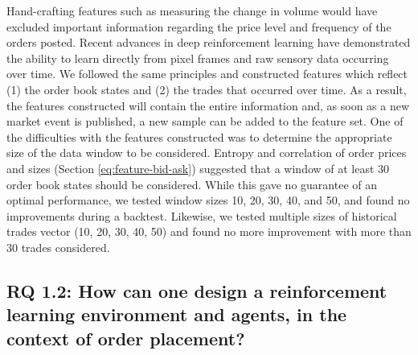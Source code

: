 Hand-crafting features such as measuring the change in volume would have excluded important information regarding the price level and frequency of the orders posted.
Recent advances in deep reinforcement learning have demonstrated the ability to learn directly from pixel frames\cite{mnih2013playing} and raw sensory data\cite{mnih2015human} occurring over time.
We followed the same principles and constructed features which reflect (1) the order book states and (2) the trades that occurred over time.
As a result, the features constructed will contain the entire information and, as soon as a new market event is published, a new sample can be added to the feature set.
One of the difficulties with the features constructed was to determine the appropriate size of the data window to be considered.
Entropy and correlation of order prices and sizes (Section \ref{eq:feature-bid-ask}) suggested that a window of at least 30 order book states should be considered.
While this gave no guarantee of an optimal performance, we tested window sizes 10, 20, 30, 40, and 50, and found no improvements during a backtest.
Likewise, we tested multiple sizes of historical trades vector (10, 20, 30, 40, 50) and found no more improvement with more than 30 trades considered.

\subsection{RQ 1.2: How can one design a reinforcement learning environment and agents, in the context of order placement?}

